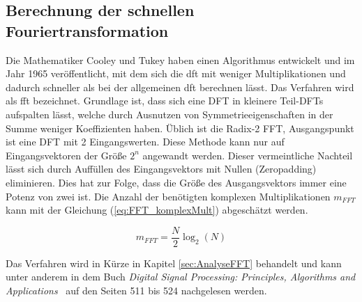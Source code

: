 \subsection{Berechnung der schnellen Fouriertransformation}\label{sec:BerechnungFFT}
Die Mathematiker Cooley und Tukey haben einen Algorithmus entwickelt und im Jahr 1965 veröffentlicht, mit dem sich die \gls{dft} mit weniger Multiplikationen
und dadurch schneller als bei der allgemeinen \gls{dft} berechnen lässt. Das Verfahren wird als \gls{fft} bezeichnet.
Grundlage ist, dass sich eine DFT
in kleinere Teil-DFTs aufspalten lässt, welche durch Ausnutzen von Symmetrieeigenschaften in der Summe weniger Koeffizienten haben. 
Üblich ist die Radix-2 FFT, Ausgangspunkt ist eine DFT mit 2 Eingangswerten. 
Diese Methode kann nur auf Eingangsvektoren der Größe $2^n$ angewandt werden. Dieser
vermeintliche Nachteil lässt sich durch Auffüllen des Eingangsvektors mit Nullen (Zeropadding) eliminieren. Dies hat zur Folge, dass die Größe des Ausgangsvektors
immer eine Potenz von zwei ist. 
Die Anzahl der benötigten komplexen Multiplikationen $m_{FFT}$ kann mit der Gleichung (\ref{eq:FFT_komplexMult}) abgeschätzt werden.


\begin{equation}\label{eq:FFT_komplexMult}
 m_{FFT} = \frac{N}{2}\log_2(N)
\end{equation}



Das Verfahren wird in Kürze in Kapitel \ref{sec:AnalyseFFT} behandelt und kann unter anderem in dem Buch 
\textit{Digital Signal Processing: Principles, Algorithms and Applications}~\autocite{john2007digital} auf den Seiten 511 bis 524 nachgelesen werden.